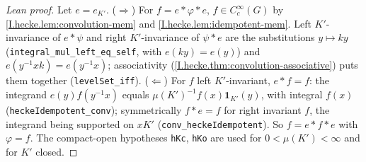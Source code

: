 \begin{proof}[Lean proof]
Let $e=e_{K'}$. ($\Rightarrow$) For $f=e*\varphi*e$, $f\in C_c^\infty(G)$ by \cref{I.hecke.lem:convolution-mem} and \cref{I.hecke.lem:idempotent-mem}. Left $K'$-invariance of $e*\psi$ and right $K'$-invariance of $\psi*e$ are the substitutions $y\mapsto ky$ (\texttt{integral\_mul\_left\_eq\_self}, with $e(ky)=e(y)$) and $e(y^{-1}xk)=e(y^{-1}x)$; associativity (\cref{I.hecke.thm:convolution-associative}) puts them together (\texttt{levelSet\_iff}). ($\Leftarrow$) For $f$ left $K'$-invariant, $e*f=f$: the integrand $e(y)f(y^{-1}x)$ equals $\mu(K')^{-1}f(x)\mathbf 1_{K'}(y)$, with integral $f(x)$ (\texttt{heckeIdempotent\_conv}); symmetrically $f*e=f$ for right invariant $f$, the integrand being supported on $xK'$ (\texttt{conv\_heckeIdempotent}). So $f=e*f*e$ with $\varphi=f$. The compact-open hypotheses \texttt{hKc}, \texttt{hKo} are used for $0<\mu(K')<\infty$ and for $K'$ closed.
\end{proof}

